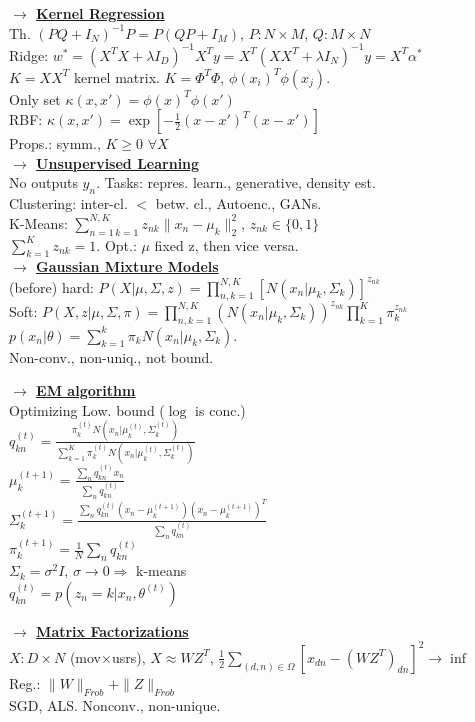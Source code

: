 \documentclass[11pt]{article}
\newcommand{\mytitle}[1]{ {\bf $\rightarrow$ \underline{#1}}\\}
\begin{document}
\begin{multicols*}{2}
\mytitle{Kernel Regression}
Th. $(PQ+I_N)^{-1}P=P(QP+I_M)$, $P\colon N\times M$, $Q\colon M\times N$\\
Ridge: $w^*=(X^TX+\lambda I_D)^{-1}X^Ty=X^T(XX^T+\lambda I_N)^{-1}y=X^T\alpha^*$\\
$K=XX^T$ kernel matrix. $K=\Phi^T\Phi$, $\phi(x_i)^T\phi(x_j)$.\\
Only set $\kappa(x,x')=\phi(x)^T\phi(x')$\\
RBF: $\kappa(x,x')=\exp\left[-\frac{1}{2}(x-x')^T(x-x')\right]$\\
Props.: symm., $K\geqslant 0$ $\forall X$\\

\mytitle{Unsupervised Learning}
No outputs $y_n$. Tasks: repres. learn., generative, density est.\\
Clustering: inter-cl. $<$ betw. cl., Autoenc., GANs.\\
K-Means: $\sum\limits_{n=1\,k=1}^{N,K}z_{nk}\|x_n-\mu_k\|_2^2$, $z_{nk}\in\{0,1\}$\\
$\sum\limits_{k=1}^Kz_{nk}=1$. Opt.: $\mu$ fixed z, then vice versa.\\

\mytitle{Gaussian Mixture Models}
(before) hard: $P(X|\mu,\Sigma,z)=\prod\limits_{n,k=1}^{N,K}\left[N(x_n|\mu_k,\Sigma_k)\right]^{z_{nk}}$\\
Soft: $P(X,z|\mu,\Sigma,\pi)=\prod\limits_{n,k=1}^{N,K}(N(x_n|\mu_k,\Sigma_k))^{z_{nk}}\prod\limits_{k=1}^K\pi_k^{z_{nk}}$\\
$p(x_n|\theta)=\sum\limits_{k=1}^k\pi_kN(x_n|\mu_k,\Sigma_k)$.\\
Non-conv., non-uniq., not bound.

\mytitle{EM algorithm}
Optimizing Low. bound ($\log$ is conc.)\\
$q_{kn}^{(t)}=\frac{\pi_k^{(t)}N(x_n|\mu_k^{(t)},\Sigma_k^{(t)})}{\sum\limits_{k=1}^K\pi_k^{(t)}N(x_n|\mu_k^{(t)},\Sigma_k^{(t)})}$\\
$\mu_k^{(t+1)}=\frac{\sum_nq_{kn}^{(t)}x_n}{\sum_n q_{kn}^{(t)}}$\\
$\Sigma_k^{(t+1)}=\frac{\sum_nq_{kn}^{(t)}(x_n-\mu_k^{(t+1)})(x_n-\mu_k^{(t+1)})^T}{\sum_nq_{kn}^{(t)}}$\\
$\pi_k^{(t+1)}=\frac{1}{N}\sum_nq_{kn}^{(t)}$\\
$\Sigma_k=\sigma^2I,\,\sigma\to0\Rightarrow$ k-means\\
$q_{kn}^{(t)}=p(z_n=k|x_n,\theta^{(t)})$

\mytitle{Matrix Factorizations}
$X\colon D\times N$ (mov$\times$usrs), $X\approx WZ^T$, $\frac{1}{2}\sum\limits_{(d,n)\in\Omega}\left[x_{dn}-(WZ^T)_{dn}\right]^2\to\inf$\\
Reg.: $\|W\|_{Frob}+\|Z\|_{Frob}$ \\
SGD, ALS. Nonconv., non-unique.



\end{multicols*}
\end{document}
